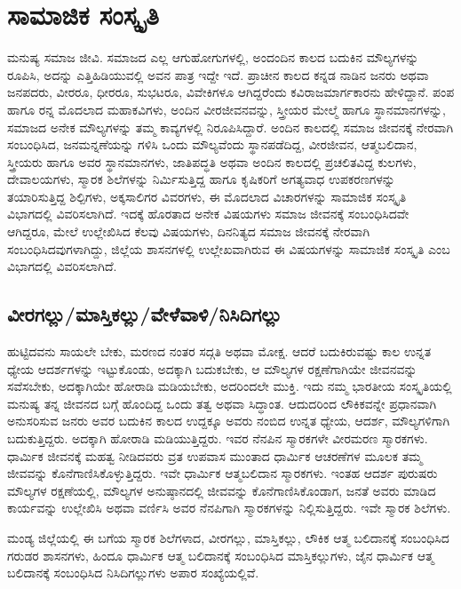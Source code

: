 \chapter{ಸಾಮಾಜಿಕ ಸಂಸ್ಕೃತಿ}

ಮನುಷ್ಯ ಸಮಾಜ ಜೀವಿ. ಸಮಾಜದ ಎಲ್ಲ ಆಗುಹೋಗುಗಳಲ್ಲಿ, ಅಂದಂದಿನ ಕಾಲದ ಬದುಕಿನ ಮೌಲ್ಯಗಳನ್ನು ರೂಪಿಸಿ, ಅದನ್ನು ಎತ್ತಿಹಿಡಿಯುವಲ್ಲಿ ಅವನ ಪಾತ್ರ ಇದ್ದೇ ಇದೆ. ಪ್ರಾಚೀನ ಕಾಲದ ಕನ್ನಡ ನಾಡಿನ ಜನರು ಅಥವಾ ಜನಪದರು, ವೀರರೂ, ಧೀರರೂ, ಸುಭಟರೂ, ವಿವೇಕಿಗಳೂ ಆಗಿದ್ದರೆಂದು ಕವಿರಾಜಮಾರ್ಗಕಾರನು ಹೇಳಿದ್ದಾನೆ. ಪಂಪ ಹಾಗೂ ರನ್ನ ಮೊದಲಾದ ಮಹಾಕವಿಗಳು, ಅಂದಿನ ವೀರಜೀವನವನ್ನು, ಸ್ತ್ರೀಯರ ಮೇಲ್ಮೆ ಹಾಗೂ ಸ್ಥಾನಮಾನಗಳನ್ನು, ಸಮಾಜದ ಅನೇಕ ಮೌಲ್ಯಗಳನ್ನು ತಮ್ಮ ಕಾವ್ಯಗಳಲ್ಲಿ ನಿರೂಪಿಸಿದ್ದಾರೆ. ಅಂದಿನ ಕಾಲದಲ್ಲಿ ಸಮಾಜ ಜೀವನಕ್ಕೆ ನೇರವಾಗಿ ಸಂಬಂಧಿಸಿದ, ಜನಮನ್ನಣೆಯನ್ನು ಗಳಿಸಿ ಒಂದು ಮೌಲ್ಯವೆಂದು ಸ್ಥಾನಪಡೆದಿದ್ದ, ವೀರಜೀವನ, ಆತ್ಮಬಲಿದಾನ, ಸ್ತ್ರೀಯರು ಹಾಗೂ ಅವರ ಸ್ಥಾನಮಾನಗಳು, ಜಾತಿ\-ಪದ್ಧತಿ ಅಥವಾ ಅಂದಿನ ಕಾಲದಲ್ಲಿ ಪ್ರಚಲಿತವಿದ್ದ ಕುಲಗಳು, ದೇವಾಲಯಗಳು, ಸ್ಮಾರಕ ಶಿಲೆಗಳನ್ನು ನಿರ್ಮಿಸುತ್ತಿದ್ದ ಹಾಗೂ ಕೃಷಿಕರಿಗೆ ಅಗತ್ಯವಾಧ ಉಪಕರಣಗಳನ್ನು ತಯಾರಿಸುತ್ತಿದ್ದ ಶಿಲ್ಪಿಗಳು, ಅಕ್ಕಸಾಲಿಗರ ವಿವರಗಳು, ಈ ಮೊದಲಾದ ವಿಚಾರಗಳನ್ನು ಸಾಮಾಜಿಕ ಸಂಸ್ಕೃತಿ ವಿಭಾಗದಲ್ಲಿ ವಿವರಿಸಲಾಗಿದೆ. ಇದಕ್ಕೆ ಹೊರತಾದ ಅನೇಕ ವಿಷಯಗಳು ಸಮಾಜ ಜೀವನಕ್ಕೆ ಸಂಬಂಧಿಸಿದವೇ ಆಗಿದ್ದರೂ, ಮೇಲೆ ಉಲ್ಲೇಖಿಸಿದ ಕೆಲವು ವಿಷಯಗಳು, ದಿನನಿತ್ಯದ ಸಮಾಜ ಜೀವನಕ್ಕೆ ನೇರವಾಗಿ ಸಂಬಂಧಿಸಿದವುಗಳಾಗಿದ್ದು, ಜಿಲ್ಲೆಯ ಶಾಸನಗಳಲ್ಲಿ ಉಲ್ಲೇಖವಾಗಿರುವ ಈ ವಿಷಯಗಳನ್ನು ಸಾಮಾಜಿಕ ಸಂಸ್ಕೃತಿ ಎಂಬ ವಿಭಾಗದಲ್ಲಿ ವಿವರಿಸಲಾಗಿದೆ.

\section*{ವೀರಗಲ್ಲು/ಮಾಸ್ತಿಕಲ್ಲು/ವೇಳೆವಾಳಿ/ನಿಸಿದಿಗಲ್ಲು}

ಹುಟ್ಟಿದವನು ಸಾಯಲೇ ಬೇಕು, ಮರಣದ ನಂತರ ಸದ್ಗತಿ ಅಥವಾ ಮೋಕ್ಷ. ಆದರೆ ಬದುಕಿರುವಷ್ಟು ಕಾಲ ಉನ್ನತ ಧ್ಯೇಯ ಆದರ್ಶಗಳನ್ನು ಇಟ್ಟುಕೊಂಡು, ಅದಕ್ಕಾಗಿ ಬದುಕಬೇಕು, ಆ ಮೌಲ್ಯಗಳ ರಕ್ಷಣೆಗಾಗಿಯೇ ಜೀವನವನ್ನು ಸವೆಸಬೇಕು, ಅದಕ್ಕಾಗಿಯೇ ಹೋರಾಡಿ ಮಡಿಯಬೇಕು, ಅದರಿಂದಲೇ ಮುಕ್ತಿ. ಇದು ನಮ್ಮ ಭಾರತೀಯ ಸಂಸ್ಕೃತಿಯಲ್ಲಿ ಮನುಷ್ಯ ತನ್ನ ಜೀವನದ ಬಗ್ಗೆ ಹೊಂದಿದ್ದ ಒಂದು ತತ್ವ ಅಥವಾ ಸಿದ್ಧಾಂತ. ಆದುದರಿಂದ ಲೌಕಿಕವನ್ನೇ ಪ್ರಧಾನವಾಗಿ ಅನುಸರಿಸುವ ಜನರು ಅವರ ಬದುಕಿನ ಕಾಲದ ಉದ್ದಕ್ಕೂ ಅವರು ನಂಬಿದ ಉನ್ನತ ಧ್ಯೇಯ, ಆದರ್ಶ, ಮೌಲ್ಯಗಳಿಗಾಗಿ ಬದುಕುತ್ತಿದ್ದರು. ಅದಕ್ಕಾಗಿ ಹೋರಾಡಿ ಮಡಿಯುತ್ತಿದ್ದರು. ಇವರ ನೆನಪಿನ ಸ್ಮಾರಕಗಳೇ ವೀರಮರಣ ಸ್ಮಾರಕಗಳು. ಧಾರ್ಮಿಕ ಜೀವನಕ್ಕೆ ಮಹತ್ವ ನೀಡಿದವರು ವ್ರತ ಉಪವಾಸ ಮುಂತಾದ ಧಾರ್ಮಿಕ ಆಚರಣೆಗಳ ಮೂಲಕ ತಮ್ಮ ಜೀವವನ್ನು ಕೊನೆಗಾಣಿಸಿಕೊಳ್ಳುತ್ತಿದ್ದರು. ಇವೇ ಧಾರ್ಮಿಕ ಆತ್ಮಬಲಿದಾನ ಸ್ಮಾರಕಗಳು. ಇಂತಹ ಆದರ್ಶ ಪುರುಷರು ಮೌಲ್ಯಗಳ ರಕ್ಷಣೆಯಲ್ಲಿ, ಮೌಲ್ಯಗಳ ಅನುಷ್ಠಾನದಲ್ಲಿ ಜೀವವನ್ನು ಕೊನೆಗಾಣಿಸಿಕೊಂಡಾಗ, ಜನತೆ ಅವರು ಮಾಡಿದ ಕಾರ್ಯವನ್ನು ಉಲ್ಲೇಖಿಸಿ ಅಥವಾ ವರ್ಣಿಸಿ ಅವರ ನೆನಪಿಗಾಗಿ ಸ್ಮಾರಕಗಳನ್ನು ನಿಲ್ಲಿಸುತ್ತಿದ್ದರು. ಇವೇ ಸ್ಮಾರಕ ಶಿಲೆಗಳು.

ಮಂಡ್ಯ ಜಿಲ್ಲೆಯಲ್ಲಿ ಈ ಬಗೆಯ ಸ್ಮಾರಕ ಶಿಲೆಗಳಾದ, ವೀರಗಲ್ಲು, ಮಾಸ್ತಿಕಲ್ಲು, ಲೌಕಿಕ ಆತ್ಮ ಬಲಿದಾನಕ್ಕೆ ಸಂಬಂಧಿಸಿದ ಗರುಡರ ಶಾಸನಗಳು, ಹಿಂದೂ ಧಾರ್ಮಿಕ ಆತ್ಮ ಬಲಿದಾನಕ್ಕೆ ಸಂಬಂಧಿಸಿದ ಮಾಸ್ತಿಕಲ್ಲುಗಳು, ಜೈನ ಧಾರ್ಮಿಕ ಆತ್ಮ ಬಲಿದಾನಕ್ಕೆ ಸಂಬಂಧಿಸಿದ ನಿಸಿದಿಗಲ್ಲುಗಳು ಅಪಾರ ಸಂಖ್ಯೆಯಲ್ಲಿವೆ.


